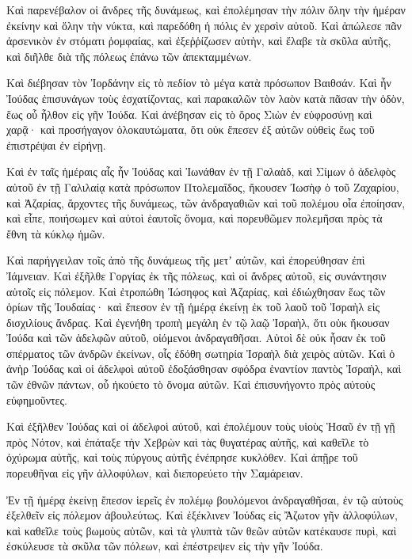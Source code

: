 {Καὶ παρενέβαλον οἱ ἄνδρες τῆς δυνάμεως, καὶ ἐπολέμησαν τὴν πόλιν ὅλην τὴν ἡμέραν ἐκείνην καὶ ὅλην τὴν νύκτα, καὶ παρεδόθη ἡ πόλις ἐν χερσὶν αὐτοῦ.
Καὶ ἀπώλεσε πᾶν ἀρσενικὸν ἐν στόματι ῥομφαίας, καὶ ἐξεῤῥίζωσεν αὐτὴν, καὶ ἔλαβε τὰ σκῦλα αὐτῆς, καὶ διῆλθε διὰ τῆς πόλεως ἐπάνω τῶν ἀπεκταμμένων.
\par }{\PP {}Καὶ διέβησαν τὸν Ἰορδάνην εἰς τὸ πεδίον τὸ μέγα κατὰ πρόσωπον Βαιθσάν.
Καὶ ἦν Ἰούδας ἐπισυνάγων τοὺς ἐσχατίζοντας, καὶ παρακαλῶν τὸν λαὸν κατὰ πᾶσαν τὴν ὁδὸν, ἕως οὗ ἦλθον εἰς γῆν Ἰούδα.
Καὶ ἀνέβησαν εἰς τὸ ὄρος Σιὼν ἐν εὐφροσύνῃ καὶ χαρᾷ· καὶ προσήγαγον ὁλοκαυτώματα, ὅτι οὐκ ἔπεσεν ἐξ αὐτῶν οὐθεὶς ἕως τοῦ ἐπιστρέψαι ἐν εἰρήνῃ.
\par }{\PP {}Καὶ ἐν ταῖς ἡμέραις αἷς ἦν Ἰούδας καὶ Ἰωνάθαν ἐν τῇ Γαλαὰδ, καὶ Σίμων ὁ ἀδελφὸς αὐτοῦ ἐν τῇ Γαλιλαίᾳ κατὰ πρόσωπον Πτολεμαΐδος,
ἤκουσεν Ἰωσὴφ ὁ τοῦ Ζαχαρίου, καὶ Ἀζαρίας, ἄρχοντες τῆς δυνάμεως, τῶν ἀνδραγαθιῶν καὶ τοῦ πολέμου οἷα ἐποίησαν,
καὶ εἶπε, ποιήσωμεν καὶ αὐτοὶ ἑαυτοῖς ὄνομα, καὶ πορευθῶμεν πολεμῆσαι πρὸς τὰ ἔθνη τὰ κύκλῳ ἡμῶν.
\par }{\PP {}Καὶ παρήγγειλαν τοῖς ἀπὸ τῆς δυνάμεως τῆς μετʼ αὐτῶν, καὶ ἐπορεύθησαν ἐπὶ Ἰάμνειαν.
Καὶ ἐξῆλθε Γοργίας ἐκ τῆς πόλεως, καὶ οἱ ἄνδρες αὐτοῦ, εἰς συνάντησιν αὐτοῖς εἰς πόλεμον.
Καὶ ἐτροπώθη Ἰώσηφος καὶ Ἀζαρίας, καὶ ἐδιώχθησαν ἕως τῶν ὁρίων τῆς Ἰουδαίας· καὶ ἔπεσον ἐν τῇ ἡμέρᾳ ἐκείνῃ ἐκ τοῦ λαοῦ τοῦ Ἰσραὴλ εἰς δισχιλίους ἄνδρας.
Καὶ ἐγενήθη τροπὴ μεγάλη ἐν τῷ λαῷ Ἰσραὴλ, ὅτι οὐκ ἤκουσαν Ἰούδα καὶ τῶν ἀδελφῶν αὐτοῦ, οἰόμενοι ἀνδραγαθῆσαι.
Αὐτοὶ δὲ οὐκ ἦσαν ἐκ τοῦ σπέρματος τῶν ἀνδρῶν ἐκείνων, οἷς ἐδόθη σωτηρία Ἰσραὴλ διὰ χειρὸς αὐτῶν.
Καὶ ὁ ἀνὴρ Ἰούδας καὶ οἱ ἀδελφοὶ αὐτοῦ ἐδοξάσθησαν σφόδρα ἑναντίον παντὸς Ἰσραὴλ, καὶ τῶν ἐθνῶν πάντων, οὗ ἠκούετο τὸ ὄνομα αὐτῶν.
Καὶ ἐπισυνήγοντο πρὸς αὐτοὺς εὐφημοῦντες.
\par }{\PP {}Καὶ ἐξῆλθεν Ἰούδας καὶ οἱ ἀδελφοὶ αὐτοῦ, καὶ ἐπολέμουν τοὺς υἱοὺς Ἡσαῦ ἐν τῇ γῇ πρὸς Νότον, καὶ ἐπάταξε τὴν Χεβρὼν καὶ τὰς θυγατέρας αὐτῆς, καὶ καθεῖλε τὸ ὀχύρωμα αὐτῆς, καὶ τοὺς πύργους αὐτῆς ἐνέπρησε κυκλόθεν.
Καὶ ἀπῇρε τοῦ πορευθῆναι εἰς γῆν ἀλλοφύλων, καὶ διεπορεύετο τὴν Σαμάρειαν.
\par }{\PP {}Ἐν τῇ ἡμέρᾳ ἐκείνῃ ἔπεσον ἱερεῖς ἐν πολέμῳ βουλόμενοι ἀνδραγαθῆσαι, ἐν τῷ αὐτοὺς ἐξελθεῖν εἰς πόλεμον ἀβουλεύτως.
Καὶ ἐξέκλινεν Ἰούδας εἰς Ἄζωτον γῆν ἀλλοφύλων, καὶ καθεῖλε τοὺς βωμοὺς αὐτῶν, καὶ τὰ γλυπτὰ τῶν θεῶν αὐτῶν κατέκαυσε πυρὶ, καὶ ἐσκύλευσε τὰ σκῦλα τῶν πόλεων, καὶ ἐπέστρεψεν εἰς τὴν γῆν Ἰούδα.

}
